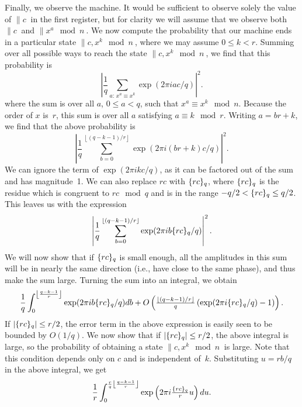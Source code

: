 Finally, we observe the machine.  It would be sufficient to observe solely
the value of $\|c\>$ in the first register, but for clarity we will 
assume that we observe both $\|c\>$
and $\|x^a\mod{n}\>$.
We now compute the probability that our machine ends in a particular
state $\|c,x^k\mod{n}\>$, where we may assume $0 \leq k < r$.
Summing over all possible ways to reach the state
$\|c,x^k\mod{n}\>$, we find that
this probability is
\begin{equation}
\left|
\frac{1}{q} \sum_{a:\, x^a\equiv x^k}
\exp(2 \pi i ac / q) 
\right|^2 .
\end{equation}
where the sum is over all $a$, $0\leq a < q$, such 
that $x^a \equiv x^k\mod{n}$.
Because the order of $x$ is~$r$, this sum is over 
all $a$ satisfying
$a \equiv k \mod{r}$.  
Writing $a=br+k$, we find that the above probability is
\begin{equation}
\left|
\frac{1}{q} \sum_{b=0}^{\left\lfloor (q-k-1)/r \right\rfloor} 
\exp(2 \pi i (br+k) c / q) 
\right|^2 .
\end{equation}
We can ignore the term of $\exp(2 \pi i kc/q)$, as it can
be factored out of the
sum and has magnitude~1.  We can also replace $rc$ with ${\{rc\}_{q}}$,
where ${\{rc\}_{q}}$ is the residue which is congruent to $rc\mod{q}$
and is in the range $-q/2 < {\{rc\}_{q}} \leq q/2$.  This leaves us with
the expression
\begin{equation}
\left|
\frac{1}{q} \sum_{b=0}^{\left\lfloor (q-k-1)/r \right\rfloor} 
\exp(2 \pi i b {\{rc\}_{q}} / q) 
\right|^2 .
\label{cprobs}
\end{equation}
We will now show that if ${\{rc\}_{q}}$
is small enough, all the amplitudes in this sum will be
in nearly the same direction (i.e., have close to the same phase), 
and thus make the sum large.
Turning the sum into an integral, we obtain
\begin{equation}
\frac{1}{q} \int_{0}^{\left\lfloor \frac{q-k-1}{r} \right\rfloor} 
\exp(2 \pi i b {\{rc\}_{q}} / q) db + 
O\left({\textstyle \frac{\lfloor (q-k-1)/r \rfloor}{q}}
\left( \exp(2\pi i {\{rc\}_{q}} /q) -1 \right) \right).
\end{equation}
If  $|{\{rc\}_{q}}| \leq r/2$, the error term in the above expression is easily
seen to be bounded by $O(1/q)$.  We now show that if $|{\{rc\}_{q}}| \leq r/2$,
the above integral is large,
so the probability of obtaining a state $\|c,x^k\mod{n}\>$ is large.
Note that this condition depends only on $c$ and is independent of~$k$.
Substituting $u=rb/q$ in the above integral,
we get
\begin{equation}
\frac{1}{r} \int_{0}^{\frac{r}{q}\left\lfloor\frac{q-k-1}{r}\right\rfloor}
\exp\left( 2\pi i {\textstyle\frac{{\{rc\}_{q}}}{r}}u \right) du.
\end{equation}
